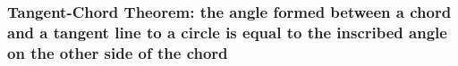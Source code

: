 \documentclass{article}
\begin{document}
\subsubsection{Tangent-Chord Theorem: the angle formed between a chord and a tangent line to a circle is equal to the inscribed angle on the other side of the chord}


\begin{minipage}{0.2\linewidth}





\begin{tikzpicture}[x=0.75pt,y=0.75pt,yscale=-1,xscale=1]


\end{tikzpicture}
\end{minipage}
\end{document}
